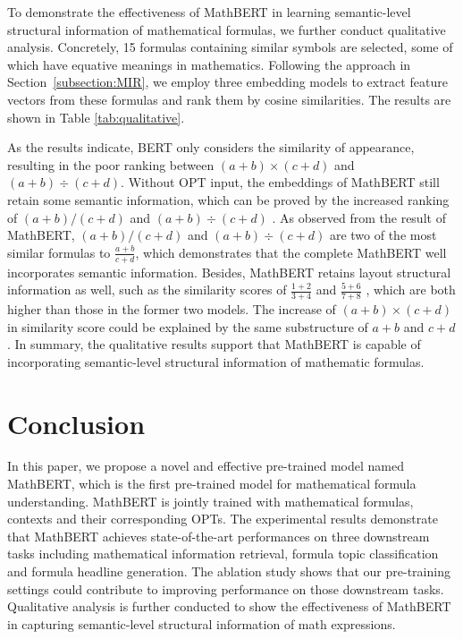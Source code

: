 \documentclass{article}
\begin{document}
To demonstrate the effectiveness of MathBERT in learning semantic-level structural information of mathematical formulas, we further conduct qualitative analysis. Concretely, 15 formulas containing similar symbols are selected, some of which have equative meanings in mathematics. Following the approach in Section~\ref{subsection:MIR}, we employ three embedding models to extract feature vectors from these formulas and rank them by cosine similarities. The results are shown in Table \ref{tab:qualitative}. 

As the results indicate, BERT only considers the similarity of appearance, resulting in the poor ranking between $ (a+b)\times(c+d) $ and $ (a+b)\div(c+d) $. Without OPT input, the embeddings of MathBERT still retain some semantic information, which can be proved by the increased ranking of $ (a+b)/(c+d) $ and $ (a+b)\div(c+d) $ . As observed from the result of MathBERT, $ (a+b)/(c+d) $ and $ (a+b)\div(c+d) $ are two of the most similar formulas to $ \frac{a+b}{c+d} $, which demonstrates that the complete MathBERT well incorporates semantic information. Besides, MathBERT retains layout structural information as well, such as the similarity scores of $ \frac{1+2}{3+4} $ and $ \frac{5+6}{7+8} $ , which are both higher than those in the former two models. The increase of $ (a+b)\times(c+d) $ in similarity score could be explained by the same substructure of $a+b$ and $c+d$. In summary, the qualitative results support that MathBERT is capable of incorporating semantic-level structural information of mathematic formulas.

\section{Conclusion}

In this paper, we propose a novel and effective pre-trained model named MathBERT, which is the first pre-trained model for mathematical formula understanding. MathBERT is jointly trained with mathematical formulas, contexts and their corresponding OPTs. The experimental results demonstrate that MathBERT achieves state-of-the-art performances on three downstream tasks including mathematical information retrieval, formula topic classification and formula headline generation. The ablation study shows that our pre-training settings could contribute to improving performance on those downstream tasks. Qualitative analysis is further conducted to show the effectiveness of MathBERT in capturing semantic-level structural information of math expressions.




\end{document}
